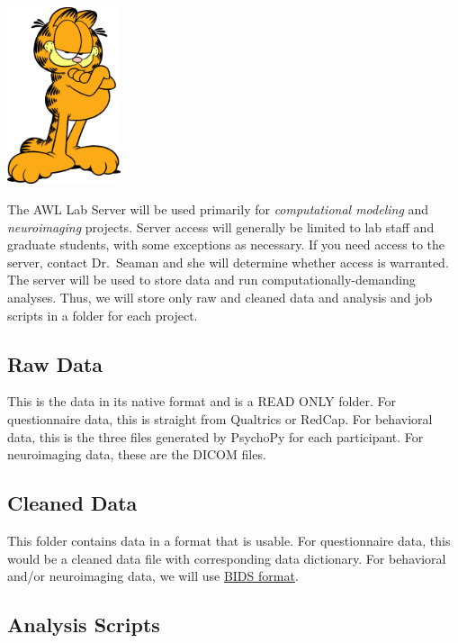 \documentclass[
]{book}
\begin{document}
\includegraphics[width=0.25\textwidth,height=\textheight]{images/garfield.jpeg}

The AWL Lab Server will be used primarily for \emph{computational modeling} and \emph{neuroimaging} projects. Server access will generally be limited to lab staff and graduate students, with some exceptions as necessary. If you need access to the server, contact Dr.~Seaman and she will determine whether access is warranted. The server will be used to store data and run computationally-demanding analyses. Thus, we will store only raw and cleaned data and analysis and job scripts in a folder for each project.

\hypertarget{raw-data}{%
\subsection{Raw Data}\label{raw-data}}

This is the data in its native format and is a READ ONLY folder. For questionnaire data, this is straight from Qualtrics or RedCap. For behavioral data, this is the three files generated by PsychoPy for each participant. For neuroimaging data, these are the DICOM files.

\hypertarget{cleaned-data}{%
\subsection{Cleaned Data}\label{cleaned-data}}

This folder contains data in a format that is usable. For questionnaire data, this would be a cleaned data file with corresponding data dictionary. For behavioral and/or neuroimaging data, we will use \href{https://bids.neuroimaging.io/}{BIDS format}.

\hypertarget{analysis-scripts}{%
\subsection{Analysis Scripts}\label{analysis-scripts}}
\end{document}
